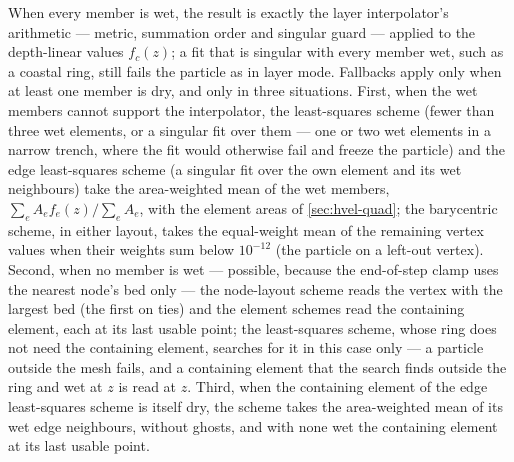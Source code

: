 When every member is wet, the result is exactly the layer interpolator's arithmetic --- metric, summation
order and singular guard --- applied to the depth-linear values $f_c(z)$; a fit that is singular with every
member wet, such as a coastal ring, still fails the particle as in layer mode. Fallbacks apply only when
at least one member is dry, and only in three situations. First, when the wet members cannot support the
interpolator, the least-squares scheme (fewer than three wet elements, or a singular fit over them --- one
or two wet elements in a narrow trench, where the fit would otherwise fail and freeze the particle) and
the edge least-squares scheme (a singular fit over the own element and its wet neighbours) take the
area-weighted mean of the wet members, $\sum_e A_e f_e(z)/\sum_e A_e$, with the element areas of
\cref{sec:hvel-quad}; the barycentric scheme, in either layout, takes the equal-weight mean of the
remaining vertex values when their weights sum below $10^{-12}$ (the particle on a left-out vertex).
Second, when no member is wet --- possible, because the end-of-step clamp uses the nearest node's bed
only --- the node-layout scheme reads the vertex with the largest bed (the first on ties) and the element
schemes read the containing element, each at its last usable point; the least-squares scheme, whose ring
does not need the containing element, searches for it in this case only --- a particle outside the mesh
fails, and a containing element that the search finds outside the ring and wet at $z$ is read at $z$. Third, when the containing element of the edge least-squares scheme is itself dry, the scheme
takes the area-weighted mean of its wet edge neighbours, without ghosts, and with none wet the containing
element at its last usable point.

